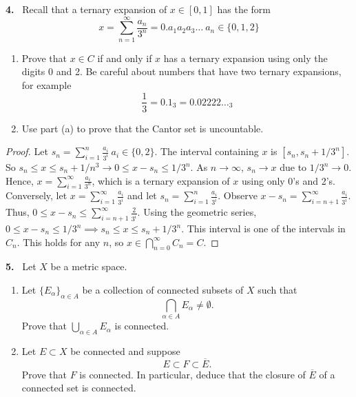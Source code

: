 \documentclass[12pt]{amsart}
\theoremstyle{plain}
\theoremstyle{definition}
\theoremstyle{remark}
\newenvironment{problem}[1]{\par\medskip\noindent\textbf{#1.}\ }{\par\smallskip}
\begin{document}
\begin{problem}{4}
Recall that a ternary expansion of $x \in [0,1]$ has the form
\[x = \sum_{n=1}^{\infty} \frac{a_n}{3^n} = 0.a_1a_2a_3\ldots \ a_n \in \{0,1,2\}\]
\begin{enumerate}
    \item[(a)] Prove that $x \in C$ if and only if $x$ has a ternary expansion using only the digits 0 and 2. Be careful about numbers that have two ternary expansions, for example 
    \[\frac{1}{3}=0.1_3 = 0.02222\ldots_3\]
    \item[(b)] Use part (a) to prove that the Cantor set is uncountable.
\end{enumerate}
\end{problem}

\begin{proof}
    Let $s_n = \sum_{i=1}^{n} \frac{a_i}{3^i} \ a_i \in \{0,2\}$. The interval containing $x$ is $[s_n, s_n + 1/3^n]$. So $s_n \le x \le s_n + 1/n^3 \to 0 \le x -s_n \le 1/3^n$. As $n \to \infty$, $s_n \to x$ due to $1/3^n \to 0$. Hence, $x = \sum_{i=1}^{\infty}\frac{a_i}{3^n}$, which is a ternary expansion of $x$ using only 0's and 2's.
    \\
    Conversely, let $x = \sum_{i=1}^{\infty} \frac{a_i}{3^i}$ and let $s_n = \sum_{i=1}^{n}\frac{a_i}{3^i}$. Observe $x - s_n = \sum_{i=n+1}^{\infty}\frac{a_i}{3^i}$. Thus, $0 \le x - s_n \le \sum_{i=n+1}^{\infty}\frac{2}{3^i}$. Using the geometric series, $0 \le x-s_n \le 1/3^n \implies s_n \le x \le s_n + 1/3^n$. This interval is one of the intervals in $C_n$. This holds for any $n$, so $x \in \bigcap_{n=0}^\infty C_n = C$. 
\end{proof}

\begin{problem}{5} Let $X$ be a metric space.
    \begin{enumerate}
    \item[(a)]
    Let $\{E_\alpha\}_{\alpha \in A}$ be a collection of connected subsets of $X$ such that 
    \[\bigcap_{\alpha \in A} E_\alpha \neq \emptyset.\]
    Prove that $\bigcup_{\alpha \in A} E_\alpha$ is connected. 
    \item[(b)] Let $E \subset X$ be connected and suppose
    \[
    E \subset F \subset \overline{E}.
    \]
    Prove that $F$ is connected. In particular, deduce that the closure of $\overline{E}$ of a connected set is connected.
\end{enumerate}
\end{problem}
\end{document}
